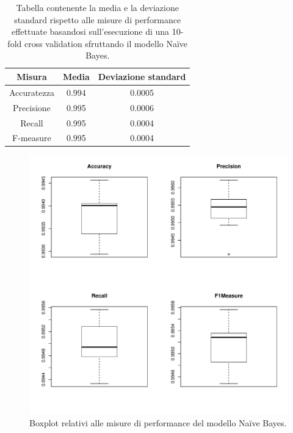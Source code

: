 \begin{table}[h!]
	\caption{Tabella contenente la media e la deviazione standard rispetto alle misure di performance effettuate basandosi sull'esecuzione di una 10-fold cross validation sfruttando il modello Na\"ive Bayes.}
	
	\label{tab:bayes_perf}
	
	\centering
	\begin{tabular}{c|cc}
		Misura & Media & Deviazione standard \\
		\hline
		Accuratezza & 0.994 & 0.0005 \\
		Precisione & 0.995 &  0.0006\\
		Recall & 0.995 & 0.0004 \\
		F-measure & 0.995 & 0.0004 \\
	\end{tabular}
\end{table} 

\begin{figure}[h!]
	\centering
	\includegraphics[width=0.7\linewidth]{../FinalResults/Bayes_performance}
	\caption{Boxplot relativi alle misure di performance del modello Na\"ive Bayes.}
	\label{fig:bayesperformance}
\end{figure}

